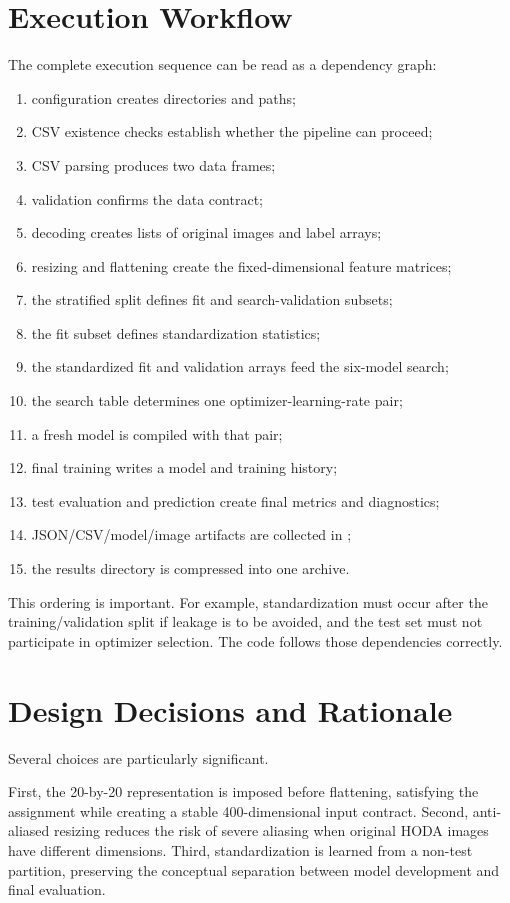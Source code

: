\documentclass[11pt,a4paper]{article}
\newcommand{\code}[1]{\texttt{\detokenize{#1}}}
\begin{document}
\section{Execution Workflow}
The complete execution sequence can be read as a dependency graph:
\begin{enumerate}
\item configuration creates directories and paths;
\item CSV existence checks establish whether the pipeline can proceed;
\item CSV parsing produces two data frames;
\item validation confirms the data contract;
\item decoding creates lists of original images and label arrays;
\item resizing and flattening create the fixed-dimensional feature matrices;
\item the stratified split defines fit and search-validation subsets;
\item the fit subset defines standardization statistics;
\item the standardized fit and validation arrays feed the six-model search;
\item the search table determines one optimizer-learning-rate pair;
\item a fresh model is compiled with that pair;
\item final training writes a model and training history;
\item test evaluation and prediction create final metrics and diagnostics;
\item JSON/CSV/model/image artifacts are collected in \code{results/};
\item the results directory is compressed into one archive.
\end{enumerate}

This ordering is important. For example, standardization must occur after the training/validation split if leakage is to be avoided, and the test set must not participate in optimizer selection. The code follows those dependencies correctly.

\section{Design Decisions and Rationale}
Several choices are particularly significant.

First, the 20-by-20 representation is imposed before flattening, satisfying the assignment while creating a stable 400-dimensional input contract. Second, anti-aliased resizing reduces the risk of severe aliasing when original HODA images have different dimensions. Third, standardization is learned from a non-test partition, preserving the conceptual separation between model development and final evaluation.
\end{document}
